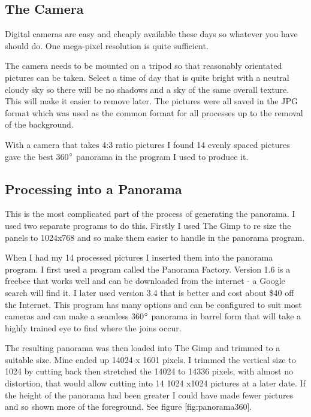 \subsection{The Camera}\label{the-camera}

Digital cameras are easy and cheaply available these days so whatever
you have should do. One mega-pixel resolution is quite sufficient.

The camera needs to be mounted on a tripod so that reasonably orientated
pictures can be taken. Select a time of day that is quite bright with a
neutral cloudy sky so there will be no shadows and a sky of the same
overall texture. This will make it easier to remove later. The pictures
were all saved in the JPG format which was used as the common format for
all processes up to the removal of the background.

With a camera that takes 4:3 ratio pictures I found 14 evenly spaced
pictures gave the best 360$\degree$ panorama in the program I used to produce
it.

\subsection{Processing into a
Panorama}\label{processing-into-a-panorama}

This is the most complicated part of the process of generating the
panorama. I used two separate programs to do this. Firstly I used The
Gimp to re size the panels to 1024x768 and so make them easier to handle
in the panorama program.

When I had my 14 processed pictures I inserted them into the panorama
program. I first used a program called the Panorama Factory. Version 1.6
is a freebee that works well and can be downloaded from the internet - a
Google search will find it. I later used version 3.4 that is better and
cost about \$40 off the Internet. This program has many options and can
be configured to suit most cameras and can make a seamless 360$\degree$ panorama
in barrel form that will take a highly trained eye to find where the
joins occur.

The resulting panorama was then loaded into The Gimp and trimmed to a
suitable size. Mine ended up 14024 x 1601 pixels. I trimmed the vertical
size to 1024 by cutting back then stretched the 14024 to 14336 pixels,
with almost no distortion, that would allow cutting into 14 1024 x1024
pictures at a later date. If the height of the panorama had been greater
I could have made fewer pictures and so shown more of the foreground.
See figure {[}fig:panorama360{]}.

